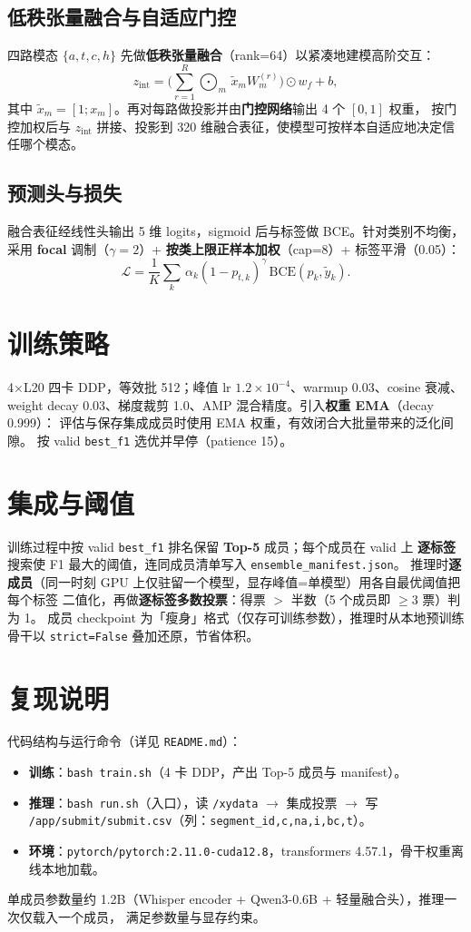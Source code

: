 \documentclass[10pt,twocolumn,a4paper]{ctexart}
\begin{document}
\subsection{低秩张量融合与自适应门控}
四路模态 $\{a,t,c,h\}$ 先做\textbf{低秩张量融合}（rank=64）以紧凑地建模高阶交互：
\[
\textstyle z_{\text{int}}=\Big(\sum_{r=1}^{R}\bigodot_{m}\,\tilde{x}_m W_m^{(r)}\Big)\odot w_f + b,
\]
其中 $\tilde{x}_m=[1;x_m]$。再对每路做投影并由\textbf{门控网络}输出 4 个 $[0,1]$ 权重，
按门控加权后与 $z_{\text{int}}$ 拼接、投影到 320 维融合表征，使模型可按样本自适应地决定信任哪个模态。

\subsection{预测头与损失}
融合表征经线性头输出 5 维 logits，sigmoid 后与标签做 BCE。针对类别不均衡，
采用 \textbf{focal} 调制（$\gamma=2$）+ \textbf{按类上限正样本加权}（cap=8）+ 标签平滑（0.05）：
\[
\mathcal{L}=\frac{1}{K}\sum_{k}\, \alpha_k(1-p_{t,k})^{\gamma}\,\mathrm{BCE}(p_k,\tilde{y}_k).
\]

\section{训练策略}
4$\times$L20 四卡 DDP，等效批 512；峰值 lr $1.2\!\times\!10^{-4}$、warmup 0.03、cosine 衰减、
weight decay 0.03、梯度裁剪 1.0、AMP 混合精度。引入\textbf{权重 EMA}（decay 0.999）：
评估与保存集成成员时使用 EMA 权重，有效闭合大批量带来的泛化间隙。
按 valid \texttt{best\_f1} 选优并早停（patience 15）。

\section{集成与阈值}
训练过程中按 valid \texttt{best\_f1} 排名保留 \textbf{Top-5} 成员；每个成员在 valid 上
\textbf{逐标签}搜索使 F1 最大的阈值，连同成员清单写入 \texttt{ensemble\_manifest.json}。
推理时\textbf{逐成员}（同一时刻 GPU 上仅驻留一个模型，显存峰值=单模型）用各自最优阈值把每个标签
二值化，再做\textbf{逐标签多数投票}：得票 $>$ 半数（5 个成员即 $\ge 3$ 票）判为 1。
成员 checkpoint 为「瘦身」格式（仅存可训练参数），推理时从本地预训练骨干以 \texttt{strict=False}
叠加还原，节省体积。

\section{复现说明}
代码结构与运行命令（详见 \texttt{README.md}）：
\begin{itemize}\setlength{\itemsep}{0pt}
\item \textbf{训练}：\texttt{bash train.sh}（4 卡 DDP，产出 Top-5 成员与 manifest）。
\item \textbf{推理}：\texttt{bash run.sh}（入口），读 \texttt{/xydata} $\rightarrow$ 集成投票 $\rightarrow$
写 \texttt{/app/submit/submit.csv}（列：\texttt{segment\_id,c,na,i,bc,t}）。
\item \textbf{环境}：\texttt{pytorch/pytorch:2.11.0-cuda12.8}，transformers 4.57.1，骨干权重离线本地加载。
\end{itemize}
单成员参数量约 1.2B（Whisper encoder + Qwen3-0.6B + 轻量融合头），推理一次仅载入一个成员，
满足参数量与显存约束。
\end{document}
